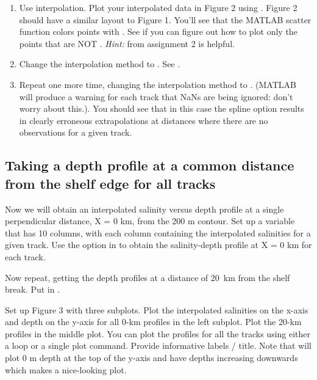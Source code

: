 \documentclass[letterpaper]{article}
\begin{document}
\begin{enumerate}

\item Use  interpolation.  Plot your interpolated data in Figure 2 using .  Figure 2 should have  a similar layout to Figure 1.  You'll see that the MATLAB scatter function colors points with .  See if you can figure out how to plot only the points that are NOT .  {\it Hint:}  from assignment 2 is helpful.

\item Change the interpolation method to .    See .   

\item  Repeat one more time, changing the interpolation method to .  (MATLAB will produce a warning for each track that NaNs are being ignored: don't worry about this.). 
You should see that in this case the spline option results in clearly erroneous extrapolations at distances where there are no observations for a given track.  

\end{enumerate}

\subsection {Taking a depth profile at a common distance from the shelf edge for all tracks}

Now we will obtain an interpolated salinity versus depth profile at a single perpendicular distance, X = 0 km, from the 200 m contour.  Set up a variable  that has 10 columns, with each column containing the interpolated salinities for a given track.  Use the  option in  to obtain the salinity-depth profile at X = 0 km for each track.  

Now repeat, getting the depth profiles at a distance of 20~km from the shelf break. Put in .

Set up Figure 3 with three subplots.  Plot the interpolated salinities on the x-axis and depth on the y-axis for all 0-km profiles in the left subplot. Plot the 20-km profiles in the middle plot. You can plot the  profiles for all the tracks using either a loop or a single plot command.  
Provide informative labels / title.  Note that  will plot 0 m depth at the top of the y-axis and have depths increasing downwards which makes a nice-looking plot.
\end{document}
